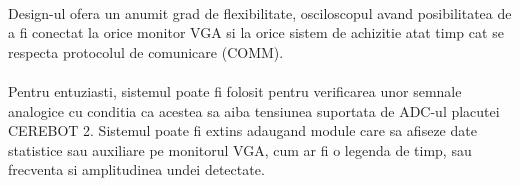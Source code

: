 \documentclass[10pt,a4paper]{article}
\begin{document}
\paragraph{}
Design-ul ofera un anumit grad de flexibilitate, osciloscopul avand posibilitatea de a fi conectat la orice monitor VGA si la orice sistem de achizitie atat timp cat se respecta protocolul de comunicare (COMM).
\paragraph{}
Pentru entuziasti, sistemul poate fi folosit pentru verificarea unor semnale analogice cu conditia ca acestea sa aiba tensiunea suportata de ADC-ul placutei CEREBOT 2. Sistemul poate fi extins adaugand module care sa afiseze date statistice sau auxiliare pe monitorul VGA, cum ar fi o legenda de timp, sau frecventa si amplitudinea undei detectate.


\end{document}
